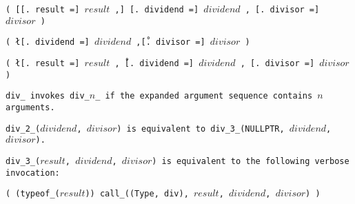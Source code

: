 
\s\s\s\tt{(} [[\tt{. result =}] $result$ \tt{,}]
[\tt{. dividend =}] $dividend$ \tt{,} [\tt{. divisor =}] $divisor$ \tt{)}

\s\tt{(} \l[\tt{. dividend =}]
$dividend$ \tt{,}\r [\tt{. divisor =}] $divisor$ \tt{)}

\s\tt{(} \l[\tt{. result =}] $result$ \tt{,}\r\
[\tt{. dividend =}] $dividend$ \tt{,} [\tt{. divisor =}] $divisor$ \tt{)}


\tt{div_} invokes \tt{div_}$n$\_ if the
expanded argument sequence contains $n$ arguments.

\tt{div_2_(}$dividend$\tt{,} $divisor$\tt{)} is equivalent to
\tt{div_3_(NULLPTR,} $dividend$\tt{,} $divisor$\tt{)}.

\tt{div_3_(}$result$\tt{,} $dividend$\tt{,} $divisor$\tt{)}
is equivalent to the following verbose invocation:

\enlargethispage*{\baselineskip}
\begin{center}
\tt{( (typeof_(}$result$\tt{)) call_((Type, div),}
$result$\tt{,} $dividend$\tt{,} $divisor$\tt{) )}
\end{center}
